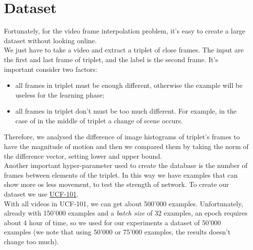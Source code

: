 \documentclass[11pt, a4paper]{article}
\begin{document}
	\section{Dataset}
	Fortunately, for the video frame interpolation problem, it's easy to create a large dataset without looking online.\\
	We just have to take a video and extract a triplet of close frames. The input are the first and last frame of triplet, and the label is the second frame. It's important consider two factors:
	\begin{itemize}
		\item all frames in triplet must be enough different, otherwise the example will be useless for the learning phase;
		\item all frames in triplet don't must be too much different. For example, in the case of in the middle of triplet a change of scene occurs. 
	\end{itemize}
	Therefore, we analysed the difference of image histograms of triplet's frames to have the magnitude of motion and then we compared them by taking the norm of the difference vector, setting lower and upper bound.\\
	Another important hyper-parameter used to create the database is the number of frames between elements of the triplet. In this way we have examples that can show more os less movement, to test the strength of network.	To create our dataset we use \href{https://www.crcv.ucf.edu/data/UCF101.php}{UCF-101}.\\
	With all videos in UCF-101, we can get about 500'000 examples. Unfortunately, already with 150'000 examples and a \textit{batch size} of 32 examples, an epoch requires about 4 hour of time, so we used for our experiments a dataset of 50'000 examples (we note that using 50'000 or 75'000 examples, the results doesn't change too much).
	 
\end{document}
